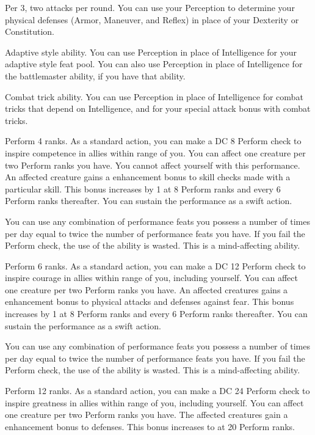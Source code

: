 \featpre Per 3, two attacks per round.
\featben You can use your Perception to determine your physical defenses (Armor, Maneuver, and Reflex) in place of your Dexterity or Constitution.

\featpre Adaptive style ability.
\featben You can use Perception in place of Intelligence for your adaptive style feat pool.
You can also use Perception in place of Intelligence for the battlemaster ability, if you have that ability.

\featpre Combat trick ability.
\featben You can use Perception in place of Intelligence for combat tricks that depend on Intelligence, and for your special attack bonus with combat tricks.

\featpre Perform 4 ranks.
\featben As a standard action, you can make a DC 8 Perform check to inspire competence in allies within \rngmed range of you.
You can affect one creature per two Perform ranks you have.
You cannot affect yourself with this performance.
An affected creature gains a  enhancement bonus to skill checks made with a particular skill.
This bonus increases by 1 at 8 Perform ranks and every 6 Perform ranks thereafter.
You can sustain the performance as a swift action.

You can use any combination of performance feats you possess a number of times per day equal to twice the number of performance feats you have.
If you fail the Perform check, the use of the ability is wasted.
This is a mind-affecting ability.

\featpre Perform 6 ranks.
\featben As a standard action, you can make a DC 12 Perform check to inspire courage in allies within \rngmed range of you, including yourself.
You can affect one creature per two Perform ranks you have.
An affected creatures gains a  enhancement bonus to physical attacks and defenses against fear.
This bonus increases by 1 at 8 Perform ranks and every 6 Perform ranks thereafter.
You can sustain the performance as a swift action.

You can use any combination of performance feats you possess a number of times per day equal to twice the number of performance feats you have.
If you fail the Perform check, the use of the ability is wasted.
This is a mind-affecting ability.

\featpre Perform 12 ranks.
\featben As a standard action, you can make a DC 24 Perform check to inspire greatness in allies within \rngmed range of you, including yourself.
You can affect one creature per two Perform ranks you have.
The affected creatures gain a  enhancement bonus to defenses.
This bonus increases to  at 20 Perform ranks.

